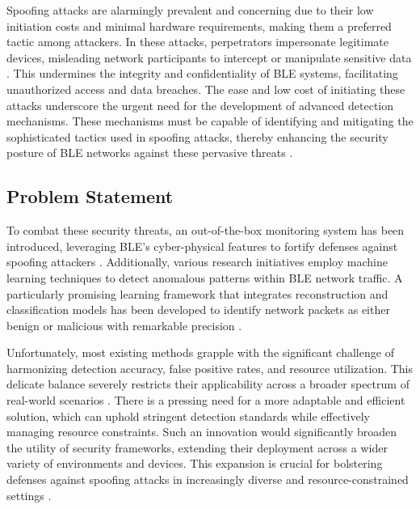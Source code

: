\vspace{8pt}

Spoofing attacks are alarmingly prevalent and concerning due to their low initiation costs and minimal hardware requirements, making them a preferred tactic among attackers. In these attacks, perpetrators impersonate legitimate devices, misleading network participants to intercept or manipulate sensitive data \cite{zhang2017secure}. This undermines the integrity and confidentiality of BLE systems, facilitating unauthorized access and data breaches. The ease and low cost of initiating these attacks underscore the urgent need for the development of advanced detection mechanisms. These mechanisms must be capable of identifying and mitigating the sophisticated tactics used in spoofing attacks, thereby enhancing the security posture of BLE networks against these pervasive threats \cite{wu2023sok}.

\vspace{4pt}


\subsection{Problem Statement}

\noindent To combat these security threats, an out-of-the-box monitoring system has been introduced, leveraging BLE's cyber-physical features to fortify defenses against spoofing attackers \cite{wu2020blueshield}. Additionally, various research initiatives employ machine learning techniques to detect anomalous patterns within BLE network traffic. A particularly promising learning framework that integrates reconstruction and classification models has been developed to identify network packets as either benign or malicious with remarkable precision \cite{lahmadi2020mitm}.

\vspace{8pt}

Unfortunately, most existing methods grapple with the significant challenge of harmonizing detection accuracy, false positive rates, and resource utilization. This delicate balance severely restricts their applicability across a broader spectrum of real-world scenarios \cite{wu2020blesa}. There is a pressing need for a more adaptable and efficient solution, which can uphold stringent detection standards while effectively managing resource constraints. Such an innovation would significantly broaden the utility of security frameworks, extending their deployment across a wider variety of environments and devices. This expansion is crucial for bolstering defenses against spoofing attacks in increasingly diverse and resource-constrained settings \cite{casar2022survey}.

